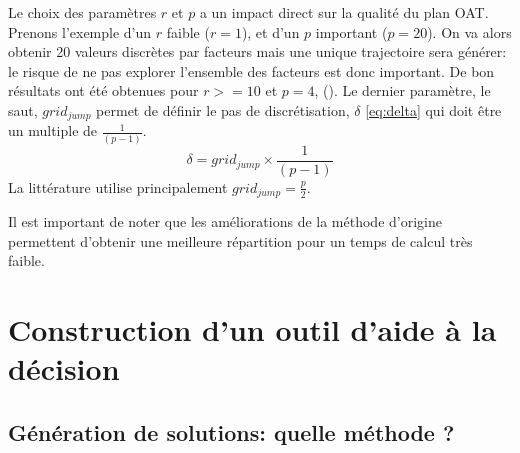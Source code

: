 Le choix des paramètres $r$ et $p$ a un impact direct sur la qualité du plan OAT.
Prenons l’exemple d’un $r$ faible ($r=1$), et d’un $p$ important ($p=20$).
On va alors obtenir 20 valeurs discrètes par facteurs mais une unique trajectoire
sera générer: le risque de ne pas explorer l’ensemble des facteurs est donc important.
De bon résultats ont été obtenues pour $r >= 10$ et $p = 4$, (\cite{Campolongo199975,Campolongo2000377,Campolongo199749}).
Le dernier paramètre, le saut, $grid_{jump}$ permet de définir le pas de discrétisation, $\delta$ \eqref{eq:delta}
qui doit être un multiple de $\frac{1}{(p - 1)}$.
\begin{equation}\label{eq:delta}
  \delta = grid_{jump} \times \frac{1}{(p - 1)}
\end{equation}
La littérature utilise principalement $grid_{jump} = \frac{p}{2}$.

Il est important de noter que les améliorations de la méthode d’origine permettent
d’obtenir une meilleure répartition pour un temps de calcul très faible.





\section{Construction d’un outil d’aide à la décision} %
\label{sec:construction_d_un_outil_d_aide_à_la_decision}


\subsection{Génération de solutions: quelle méthode ?} %
\label{sub:generation_de_solutions_quelle_methode}

